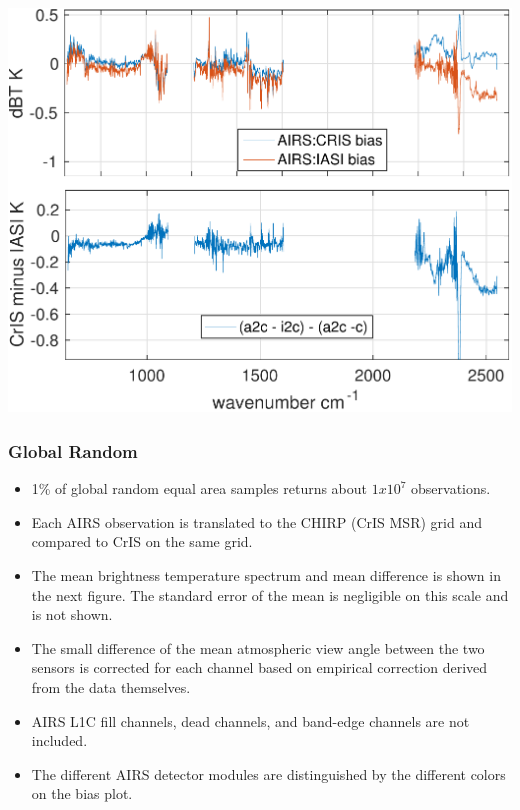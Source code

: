 \documentclass[10pt,t]{beamer}
\begin{document}
\begin{frame}
  \frametitle{}
  \begin{center}
   \includegraphics[width=\linewidth]{./Figs/Pdf/ac_ai_2017_sno_msr_dble_diff_bias_aslp.pdf}
  \end{center}

\end{frame}

\begin{frame}
  \frametitle{Global Random}
  \begin{itemize}
    \item 1\% of global random equal area samples returns about $1 x 10^7$ observations.
    \item Each AIRS observation is translated to the CHIRP (CrIS MSR) grid and compared to  CrIS on the same grid.
    \item The mean brightness temperature spectrum and mean difference is shown in the next figure. The standard error of the mean is negligible on this scale and is not shown.
      \item The small difference of the mean atmospheric view angle between the two sensors is corrected for each channel based on empirical correction derived from the data themselves.
    \item AIRS L1C fill channels, dead channels, and band-edge channels are not included.
      \item The different AIRS detector modules are distinguished by the different colors on the bias plot.
  \end{itemize}

\end{frame}
  
\end{document}
